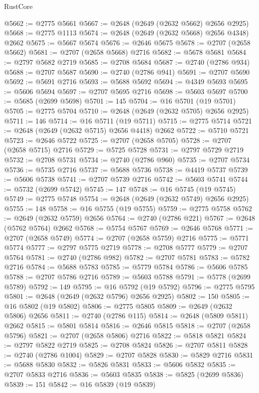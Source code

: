 \begin{lexlean}{RustCore}
\begin{coremodule}
@5662 := @2775 @5661
@5667 := @2648 (@2649 (@2632 @5662) @2656 @2925)
@5668 := @2775 @1113
@5674 := @2648 (@2649 (@2632 @5668) @2656 @4348) @2662
@5675 := @5667 @5674
@5676 := @2646 @5675
@5678 := @2707 (@2658 @5662)
@5681 := @2707 (@2658 @5668) @2716
@5682 := @5678 @5681
@5684 := @2797 @5682 @2719
@5685 := @2708 @5684
@5687 := @2740 (@2786 @934)
@5688 := @2707 @5687
@5690 := @2740 (@2786 @941)
@5691 := @2707 @5690
@5692 := @5691 @2716
@5693 := @5688 @5692
@5694 := @4349 @5693
@5695 := @5606 @5694
@5697 := @2707 @5695 @2716
@5698 := @5603 @5697
@5700 := @5685 (@2699 @5698)
@5701 := 145
@5704 := @16 @5701 (@19 @5701)
@5705 := @2775 @5704
@5710 := @2648 (@2649 (@2632 @5705) @2656 @2925)
@5711 := 146
@5714 := @16 @5711 (@19 @5711)
@5715 := @2775 @5714
@5721 := @2648 (@2649 (@2632 @5715) @2656 @4418) @2662
@5722 := @5710 @5721
@5723 := @2646 @5722
@5725 := @2707 (@2658 @5705)
@5728 := @2707 (@2658 @5715) @2716
@5729 := @5725 @5728
@5731 := @2797 @5729 @2719
@5732 := @2708 @5731
@5734 := @2740 (@2786 @960)
@5735 := @2707 @5734
@5736 := @5735 @2716
@5737 := @5688 @5736
@5738 := @4419 @5737
@5739 := @5606 @5738
@5741 := @2707 @5739 @2716
@5742 := @5603 @5741
@5744 := @5732 (@2699 @5742)
@5745 := 147
@5748 := @16 @5745 (@19 @5745)
@5749 := @2775 @5748
@5754 := @2648 (@2649 (@2632 @5749) @2656 @2925)
@5755 := 148
@5758 := @16 @5755 (@19 @5755)
@5759 := @2775 @5758
@5762 := @2649 (@2632 @5759) @2656
@5764 := @2740 (@2786 @221)
@5767 := @2648 (@5762 @5764) @2662
@5768 := @5754 @5767
@5769 := @2646 @5768
@5771 := @2707 (@2658 @5749)
@5774 := @2707 (@2658 @5759) @2716
@5775 := @5771 @5774
@5777 := @2797 @5775 @2719
@5778 := @2708 @5777
@5779 := @2707 @5764
@5781 := @2740 (@2786 @982)
@5782 := @2707 @5781
@5783 := @5782 @2716
@5784 := @5688 @5783
@5785 := @5779 @5784
@5786 := @5606 @5785
@5788 := @2707 @5786 @2716
@5789 := @5603 @5788
@5791 := @5778 (@2699 @5789)
@5792 := 149
@5795 := @16 @5792 (@19 @5792)
@5796 := @2775 @5795
@5801 := @2648 (@2649 (@2632 @5796) @2656 @2925)
@5802 := 150
@5805 := @16 @5802 (@19 @5802)
@5806 := @2775 @5805
@5809 := @2649 (@2632 @5806) @2656
@5811 := @2740 (@2786 @115)
@5814 := @2648 (@5809 @5811) @2662
@5815 := @5801 @5814
@5816 := @2646 @5815
@5818 := @2707 (@2658 @5796)
@5821 := @2707 (@2658 @5806) @2716
@5822 := @5818 @5821
@5824 := @2797 @5822 @2719
@5825 := @2708 @5824
@5826 := @2707 @5811
@5828 := @2740 (@2786 @1004)
@5829 := @2707 @5828
@5830 := @5829 @2716
@5831 := @5688 @5830
@5832 := @5826 @5831
@5833 := @5606 @5832
@5835 := @2707 @5833 @2716
@5836 := @5603 @5835
@5838 := @5825 (@2699 @5836)
@5839 := 151
@5842 := @16 @5839 (@19 @5839)

\end{coremodule}
\end{lexlean}
